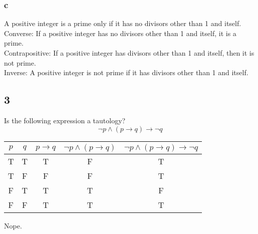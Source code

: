 \documentclass{math}
\begin{document}
\subsubsection*{c}
A positive integer is a prime only if it has no divisors other than 1 and
itself. \\
Converse: If a positive integer has no divisors other than 1 and itself, it is
a prime. \\
Contrapositive: If a positive integer has divisors other than 1 and itself,
then it is not prime. \\
Inverse: A positive integer is not prime if it has divisors other than 1 and
itself.

\subsection*{3}
Is the following expression a tautology?
\[ \neg{p} \wedge (p \to q) \to \neg{q} \]
\begin{center}
  \begin{tabular}{|c|c|c|c|c|}
    \hline
    \( p \) & \( q \) & \( p \to q \) & \( \neg{p} \wedge (p \to q) \) &
    \( \neg{p} \wedge (p \to q) \to \neg{q} \) \\ \hline
    T & T & T & F & T \\ \hline
    T & F & F & F & T \\ \hline
    F & T & T & T & F \\ \hline
    F & F & T & T & T \\ \hline
  \end{tabular}
\end{center}
Nope.
\end{document}
